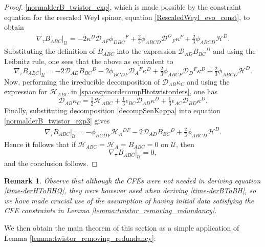 \documentclass[10pt,a4paper]{article}
\theoremstyle{plain}
\newtheorem{remark}{Remark}
\begin{document}
\begin{proof}
\eqref{normalderB_twistor_exp}, which is made possible by the
constraint equation for the rescaled Weyl spinor, equation
\eqref{RescaledWeyl_evo_const}, to obtain
\begin{align}\label{normalderB_twistor_exp2}
\nabla_{\tau}B_{ABC}|_{\mathcal{U}}= -2 \kappa ^{D} \mathcal{D}
_{AF}\phi _{DBC}{}^{F} + \tfrac{2}{3} \phi _{ABCD} \mathcal{D}
^{D}{}_{F}\kappa ^{F} + \tfrac{2}{3}\phi_{ABCD}\mathcal{H}^D.
\end{align}
Substituting the definition of $B_{ABC}$ into the expression
$\mathcal{D} _{AD}B_{BC}{}^{D}$ and using the Leibnitz rule, one sees
that the above as equivalent to
\begin{equation}\label{normalderB_twistor_exp3}
\nabla_{\tau}B_{ABC}|_{\mathcal{U}}= -2 \mathcal{D} _{AD}B_{BC}{}^{D}
-2 \phi _{BCDF} \mathcal{D} _{A}{}^{F}\kappa ^{D} +\tfrac{2}{3} \phi
_{ABCF} \mathcal{D} _{D}{}^{F}\kappa ^{D} +
\tfrac{2}{3}\phi_{ABCD}\mathcal{H}^D.
\end{equation}
Now, performing the irreducible decomposition of $\mathcal{D}
_{AB}\kappa _{C}$ and using the expression for $\mathcal{H}_{ABC}$ in
\eqref{spacespinordecompHtotwistorders}, one has
\begin{equation}\label{decompSenKappa}
\mathcal{D} _{AB}\kappa _{C} = \tfrac{1}{2} \mathcal{H} _{ABC} +
\tfrac{1}{3} \epsilon _{BC} \mathcal{D} _{AD}\kappa ^{D} +
\tfrac{1}{3} \epsilon _{AC} \mathcal{D} _{BD}\kappa ^{D}.
\end{equation}
Finally, substituting decomposition \eqref{decompSenKappa} into
equation \eqref{normalderB_twistor_exp3} gives
\begin{align}\label{time-derBToBH}
\nabla_{\tau}B_{ABC}|_{\mathcal{U}}=- \phi _{BCDF} \mathcal{H}
_{A}{}^{DF} -2 \mathcal{D} _{AD}B_{BC}{}^{D} +
\tfrac{2}{3}\phi_{ABCD}\mathcal{H}^D.
\end{align}
Hence it follows that if $\mathcal{H}_{ABC}=\mathcal{H}_A=B_{ABC}=0$
on $\mathcal{U}$, then
\[\nabla_{\bm\tau}B_{ABC}|_{\mathcal{U}}=0, \]
and the conclusion follows.
\end{proof} 
\begin{remark}\emph{
Observe that although the CFEs were not needed in deriving equation \eqref{time-derHToBHQ}, they were however used when deriving \eqref{time-derBToBH}, so we have made crucial use of the assumption of having initial data satisfying the CFE
constraints in Lemma \ref{lemma:twistor_removing_redundancy}.  }
\end{remark}

We then obtain the main theorem of this section as a simple
application of Lemma \ref{lemma:twistor_removing_redundancy}:
\end{document}
